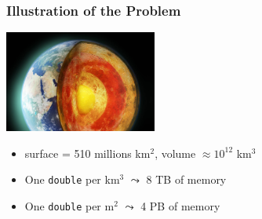 \documentclass[xcolor={x11names,svgnames,psnames}]{beamer}
\begin{document}





\begin{frame}
\frametitle{Illustration of the Problem}

\begin{center}
\includegraphics[width=5cm]{earth-core.jpg}
\end{center}

\begin{itemize}
\item surface = 510 millions km${^2}$, volume $\approx 10^{12}$ km${}^3$
  \medskip
\item One \texttt{double} per km${}^3$ $\leadsto$ 8 TB of memory

\item One \texttt{double} per m${}^2$ $\leadsto$ 4 PB of memory
\end{itemize}

\end{frame}
\end{document}
